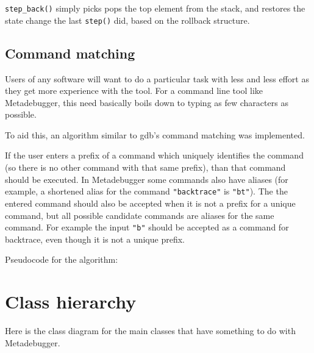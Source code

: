 
\verb$step_back()$ simply picks pops the top element from the stack, and
restores the state change the last \verb$step()$ did, based on the
rollback structure.


\subsection{Command matching}

Users of any software will want to do a particular task with less and less
effort as they get more experience with the tool. For a command line tool like
Metadebugger, this need basically boils down to typing as few characters as
possible.

To aid this, an algorithm similar to gdb's command matching was implemented.

If the user enters a prefix of a command which uniquely identifies the command
(so there is no other command with that same prefix), than that command should
be executed. In Metadebugger some commands also have aliases (for example, a
shortened alias for the command \verb$"backtrace"$ is \verb$"bt"$). The
the entered command should also be accepted when it is not a prefix for a
unique command, but all possible candidate commands are aliases for the same
command. For example the input \verb$"b"$ should be accepted as a command
for backtrace, even though it is not a unique prefix.

Pseudocode for the algorithm:


\section{Class hierarchy}

Here is the class diagram for the main classes that have something to do with
Metadebugger.

